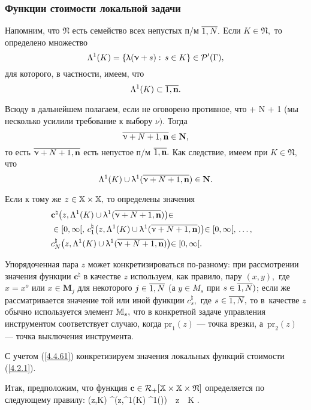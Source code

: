 \subsubsection*{Функции стоимости локальной задачи}

Напомним, что $\mathfrak{N}$
есть семейство всех непустых п/м $\ov{1,N}.$
Если $K\in \mathfrak{N},$
то определено множество
$$
  \Lambda^1(K) = \{\uplambda(\upnu+s):\,s\in K\}\in {\cal P}^\prime(\Gamma)
  ,
$$
для которого, в частности, имеем, что
$$
  \La^1(K) \subset \ov{1,\mathbf{n}}
  .
$$

Всюду в дальнейшем полагаем, если не оговорено противное, что
\bfn
  \label{4.4.60}
  \nu + N + 1 \leqslant {}
\efn
(мы несколько усилили требование к выбору $\nu).$
Тогда
$$
  \ov{\nu+N+1,\mathbf{n}}\in \mathbf{N}
  ,
$$
то есть
$\ov{\nu+N+1,\mathbf{n}}$
есть непустое п/м $\ov{1,\mathbf{n}}.$
Как следствие,
имеем при
$K\in \mathfrak{N},$ что
$$
  \La^1(K) \cup \la^1(\ov{\nu+N+1,\mathbf{n}})\in \mathbf{N}
  .
$$

Если к тому же
$z\in {\mathbb X} \times {\mathbb X},$ то определены значения
\begin{eqnarray}
  &\mathbf{c}^\natural\bigl(z,\La^1(K) \cup \la^1(\ov{\nu+N+1,\mathbf{n}})\bigl)\in
  &\nonumber\\
  &\in[0,\infty[,\,c_1^\natural\bigl(z,\La^1(K) \cup \la^1(\ov{\nu+N+1,\mathbf{n}})\bigl)\in [0,\infty[,
  \,\ldots,
  &\nonumber\\
  &c_N^\natural\bigl(z,\La^1(K) \cup \la^1(\ov{\nu+N+1,\mathbf{n}})\bigl)\in [0,\infty[
  .
  &
  \label{4.4.61}
\end{eqnarray}

Упорядоченная пара $z$ может конкретизироваться по-разному:
при рассмотрении значения функции $\mathbf{c}^\natural$
в качестве  $z$ используем,
как правило, пару $(x,y),$ где
$x= x^o$ или $x\in \mathbf{M}_j$ для некоторого
$j\in\ov{1,N}$
(а $y\in M_s$ при $s\in \ov{1,N})$;
если же рассматривается значение той или иной функции $c_s^\natural,$ где
$s\in \ov{1,N},$
то в~качестве $z$ обычно используется элемент ${\mathbb M}_s,$
что в конкретной задаче управления инструментом соответствует случаю, когда
$\mathrm{pr}_1(z)$ --- точка врезки, а~$\mathrm{pr}_2(z)$ --- точка выключения инструмента.

С учетом (\ref{4.4.61})
конкретизируем значения локальных функций стоимости (\ref{4.2.1}).

Итак, предположим, что функция
$\mathbf{c}\in {\cal R}_+[{\mathbb X} \times {\mathbb X} \times \mathfrak{N}]$
определяется по следующему правилу:
\bfn
  \label{4.4.62}
  (z,K) \df {}^\natural\bigl(z,\La^1(K) \cup \la^1()\bigl)\ \ \fa z\in \bbx \times \bbx\ \ \fa K\in {}
  .
\efn

